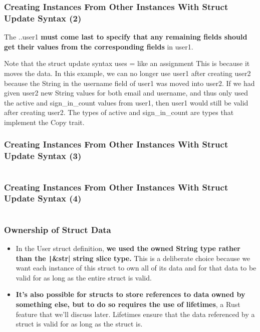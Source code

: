 \documentclass{beamer}
\begin{document}
\begin{frame}[fragile]
	\frametitle{Creating Instances From Other Instances With Struct Update Syntax (2)}
	The ..user1 \textbf{must come last to specify that any remaining fields should get their values from the corresponding fields} in user1.
	
	\begin{block}{Note that the struct update syntax uses = like an assignment}
		This is because it moves the data. In this example, we can no longer use user1 after creating user2 because the String in the username field of user1 was moved into user2. If we had given user2 new String values for both email and username, and thus only used the active and sign\_in\_count values from user1, then user1 would still be valid after creating user2. The types of active and sign\_in\_count are types that implement the Copy trait.
	\end{block}
	
\end{frame}


\begin{frame}[fragile]
	\frametitle{Creating Instances From Other Instances With Struct Update Syntax (3)}
		\inputminted{rust}{./code/struct-err.rs}
\end{frame}


\begin{frame}[fragile]
	\frametitle{Creating Instances From Other Instances With Struct Update Syntax (4)}
	\inputminted{shell}{./code/struct-err2.shell}
\end{frame}

\begin{frame}[fragile]
	\frametitle{Ownership of Struct Data}
	\begin{itemize}
		\item In the User struct definition,\textbf{ we used the owned String type rather than the \texttt|&str| string slice type.} This is a deliberate choice because we want each instance of this struct to own all of its data and for that data to be valid for as long as the entire struct is valid.
		\item 	\textbf{It’s also possible for structs to store references to data owned by something else, but to do so requires the use of lifetimes}, a Rust feature that we’ll discuss later. Lifetimes ensure that the data referenced by a struct is valid for as long as the struct is.
	\end{itemize}
\end{frame}
\end{document}
